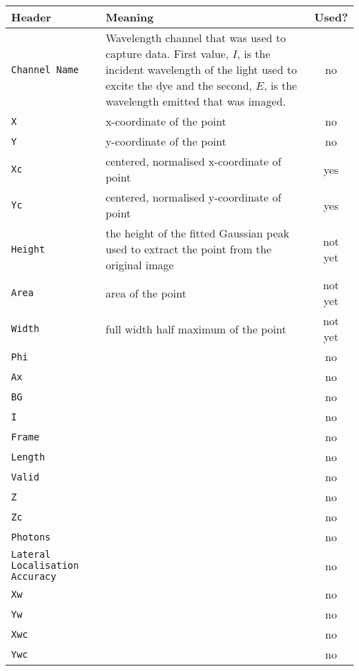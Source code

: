 \begin{center}
	\begin{tabu}{p{1.1cm} X c}
		\toprule
		Header & Meaning & Used? \\
		\midrule
		\texttt{Channel Name} & Wavelength channel that was used to capture data.
			First value, $I$, is the incident wavelength of the light used to
			excite the dye and the second, $E$, is the wavelength emitted that
			was imaged. & no \\
		\texttt{X} & x-coordinate of the point & no \\
		\texttt{Y} & y-coordinate of the point & no \\
		\texttt{Xc} & centered, normalised x-coordinate of point & yes \\
		\texttt{Yc} & centered, normalised y-coordinate of point & yes \\
		\texttt{Height} & the height of the fitted Gaussian peak used to
			extract the point from the original image & not yet \\
		\texttt{Area} & area of the point & not yet \\
		\texttt{Width} & full width half maximum of the point & not yet \\
		\texttt{Phi}          &  & no \\
		\texttt{Ax}           &  & no \\
		\texttt{BG}           &  & no \\
		\texttt{I}            &  & no \\
		\texttt{Frame}        &  & no \\
		\texttt{Length}       &  & no \\
		\texttt{Valid}        &  & no \\
		\texttt{Z}            &  & no \\
		\texttt{Zc}           &  & no \\
		\texttt{Photons}      &  & no \\
		\texttt{Lateral Localisation Accuracy}     &  & no \\
		\texttt{Xw}           &  & no \\
		\texttt{Yw}           &  & no \\
		\texttt{Xwc}          &  & no \\
		\texttt{Ywc}          &  & no \\
		\bottomrule
	\end{tabu}
\end{center}
